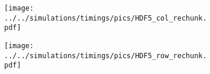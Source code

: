 \documentclass{article}
\begin{document}
\begin{figure}[bt]
    \begin{subfigure}[bt]{0.49\textwidth}
        \texttt{[image: ../../simulations/timings/pics/HDF5\_col\_rechunk.pdf]}
        \caption{}
    \end{subfigure}
    \begin{subfigure}[bt]{0.49\textwidth}
        \texttt{[image: ../../simulations/timings/pics/HDF5\_row\_rechunk.pdf]}
        \caption{}
    \end{subfigure}
\end{figure}
\end{document}
